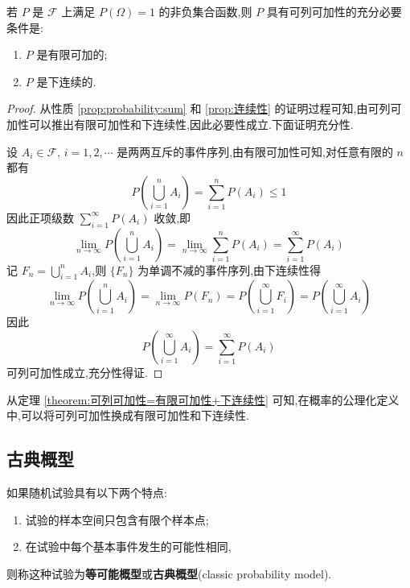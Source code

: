 \begin{theorem}[][][theorem:可列可加性=有限可加性+下连续性]
    \indent 若 $P$ 是 $\mathcal{F}$ 上满足 $P(\varOmega) = 1$ 的非负集合函数,则 $P$ 具有可列可加性的充分必要条件是:
    \begin{enumerate}
        \item $P$ 是有限可加的;
        \item $P$ 是下连续的.
    \end{enumerate}
\end{theorem}

\begin{proof}
    从性质 \ref{prop:probability:sum} 和 \ref{prop:连续性} 的证明过程可知,由可列可加性可以推出有限可加性和下连续性,因此必要性成立.下面证明充分性.

    设 $A_i \in \mathcal{F}, \, i=1,2,\cdots$ 是两两互斥的事件序列,由有限可加性可知,对任意有限的 $n$ 都有
    $$
    P \left( \bigcup_{i=1}^n A_i \right) = \sum_{i=1}^n P(A_i) \leqslant 1
    $$
    因此正项级数 $\displaystyle\sum_{i=1}^{\infty} P(A_i)$ 收敛,即
    $$
    \lim_{n \to \infty} P \left( \bigcup_{i=1}^n A_i \right) = \lim_{n \to \infty} \sum_{i=1}^n P(A_i) = \sum_{i=1}^{\infty} P(A_i)
    $$
    记 $F_n = \displaystyle\bigcup_{i=1}^n A_i$,则 $\{ F_n \}$ 为单调不减的事件序列,由下连续性得
    $$
    \lim_{n \to \infty} P \left( \bigcup_{i=1}^n A_i \right) = \lim_{n \to \infty} P(F_n) = P \left(  \bigcup_{i=1}^{\infty} F_i \right) = P \left( \bigcup_{i=1}^{\infty} A_i \right)
    $$
    因此
    $$
    P \left( \bigcup_{i=1}^{\infty} A_i \right) = \sum_{i=1}^{\infty} P(A_i)
    $$
    可列可加性成立,充分性得证.
\end{proof}

\begin{note}
    \indent 从定理 \ref{theorem:可列可加性=有限可加性+下连续性} 可知,在概率的公理化定义中,可以将可列可加性换成有限可加性和下连续性.
\end{note}

\subsection{古典概型}

如果随机试验具有以下两个特点:
\begin{enumerate}
    \item 试验的样本空间只包含有限个样本点;
    \item 在试验中每个基本事件发生的可能性相同,
\end{enumerate}
则称这种试验为\textbf{等可能概型}或\textbf{古典概型}(classic probability model).


